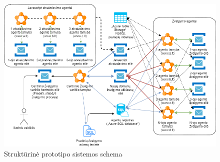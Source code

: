 \begin{figure}[htp!]
\centering
\includegraphics[scale=0.6]{img/Azure_Implementacija_Kasparo.png}
\caption{Struktūrinė prototipo sistemos schema}
\label{fig:azure_implementation_structural_scheme}
\end{figure}
